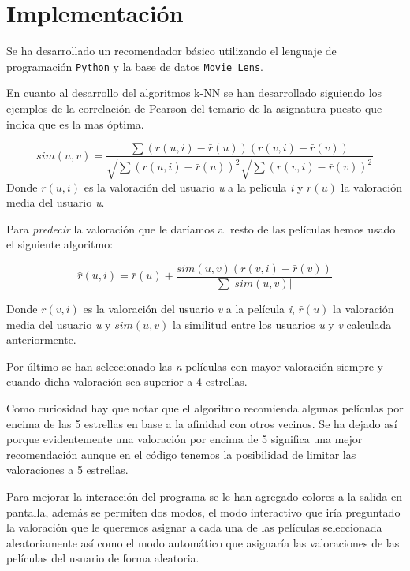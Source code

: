 \chapter{Implementación}

Se ha desarrollado un recomendador básico utilizando el lenguaje de programación \texttt{Python} y la base de datos \texttt{Movie Lens}.

\bigskip
En cuanto al desarrollo del algoritmos k-NN se han desarrollado siguiendo los ejemplos de la correlación de Pearson del temario de la asignatura puesto que indica que es la mas óptima.

\[ sim(u,v) = \frac{\sum(r(u,i)-\bar{r}(u))(r(v,i)-\bar{r}(v))}{\sqrt{\sum(r(u,i)-\bar{r}(u))^2}\sqrt{\sum(r(v,i)-\bar{r}(v))^2}} \]
Donde $ r(u,i) $ es la valoración del usuario \textit{u} a la película \textit{i} y $ \bar{r}(u) $ la valoración media del usuario \textit{u}.

\bigskip
Para \textit{predecir} la valoración que le daríamos al resto de las películas hemos usado el siguiente algoritmo:

\[ \hat{r}(u,i) = \bar{r}(u) + \frac{sim(u,v)(r(v,i)-\bar{r}(v))}{\sum|sim(u,v)|} \]

Donde $ r(v,i) $ es la valoración del usuario \textit{v} a la película \textit{i}, $ \bar{r}(u) $ la valoración media del usuario \textit{u} y $ sim(u,v) $ la similitud entre los usuarios \textit{u} y \textit{v} calculada anteriormente.

\bigskip
Por último se han seleccionado las \textit{n} películas con mayor valoración siempre y cuando dicha valoración sea superior a 4 estrellas.

\bigskip
Como curiosidad hay que notar que el algoritmo recomienda algunas películas por encima de las 5 estrellas en base a la afinidad con otros vecinos. Se ha dejado así porque evidentemente una valoración por encima de 5 significa una mejor recomendación aunque en el código tenemos la posibilidad de limitar las valoraciones a 5 estrellas.

\bigskip
Para mejorar la interacción del programa se le han agregado colores a la salida en pantalla, además se permiten dos modos, el modo interactivo que iría preguntado la valoración que le queremos asignar a cada una de las películas seleccionada aleatoriamente así como el modo automático que asignaría las valoraciones de las películas del usuario de forma aleatoria.

